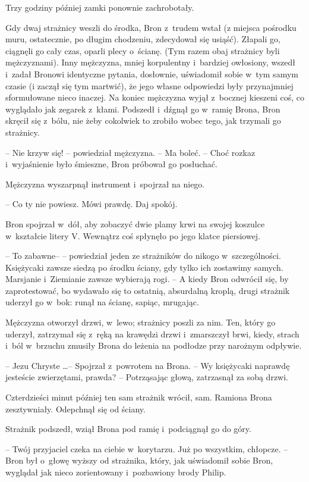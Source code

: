 \documentclass[oneside,polish,11pt,rmheadings]{mwbk}
\begin{document}
Trzy godziny później zamki ponownie zachrobotały. 

Gdy dwaj strażnicy weszli do środka, Bron z~trudem wstał (z miejsca pośrodku muru, ostatecznie, po długim chodzeniu, zdecydował się usiąść). Złapali go, ciągnęli go cały czas, oparli plecy o~ścianę.  (Tym razem obaj strażnicy byli mężczyznami). Inny mężczyzna, mniej korpulentny i~bardziej owłosiony, wszedł i~zadał Bronowi identyczne pytania, dosłownie, uświadomił sobie w~tym samym czasie (i zaczął się tym martwić), że jego własne odpowiedzi były przynajmniej sformułowane nieco inaczej. Na koniec mężczyzna wyjął z~bocznej kieszeni coś, co wyglądało jak zegarek z~kłami. Podszedł i~dźgnął go w~ramię Brona, Bron skręcił się z~bólu, nie żeby cokolwiek to zrobiło wobec tego, jak trzymali go strażnicy. 

-- Nie krzyw się! -- powiedział mężczyzna. -- Ma boleć. --  Choć rozkaz i~wyjaśnienie było śmieszne, Bron próbował go posłuchać. 

Mężczyzna wyszarpnął instrument i~spojrzał na niego. 

-- Co ty nie powiesz. Mówi prawdę. Daj spokój. 

Bron spojrzał w~dół, aby zobaczyć dwie plamy krwi na swojej koszulce w~kształcie litery V.  Wewnątrz coś spłynęło po jego klatce piersiowej. 

-- To zabawne-- -- powiedział jeden ze strażników do nikogo w~szczególności. Księżycaki zawsze siedzą po środku ściany, gdy tylko ich zostawimy samych. Marsjanie i~Ziemianie zawsze wybierają rogi. -- A kiedy Bron odwrócił się, by zaprotestować, bo wydawało się to ostatnią, absurdalną kroplą, drugi strażnik uderzył go w~bok: runął na ścianę, sapiąc, mrugając. 

Mężczyzna otworzył drzwi, w~lewo; strażnicy poszli za nim. Ten, który go uderzył, zatrzymał się z~ręką na krawędzi drzwi i~zmarszczył brwi, kiedy, strach i~ból w~brzuchu zmusiły Brona do leżenia na podłodze przy narożnym odpływie. 

-- Jezu Chryste \ldots  -- Spojrzał z~powrotem na Brona. -- Wy księżycaki naprawdę jesteście zwierzętami, prawda? -- Potrząsając głową, zatrzasnął za sobą drzwi. 

Czterdzieści minut później ten sam strażnik wrócił, sam.  Ramiona Brona zesztywniały. Odepchnął się od ściany. 

Strażnik podszedł, wziął Brona pod ramię i~podciągnął go do góry. 

-- Twój przyjaciel czeka na ciebie w~korytarzu. Już po wszystkim, chłopcze. -- Bron był o~głowę wyższy od strażnika, który, jak uświadomił sobie Bron, wyglądał jak nieco zorientowany i~pozbawiony brody Philip. 
\end{document}
